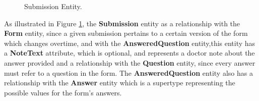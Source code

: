 \begin{figure}[h]
	\begin{center}
	\end{center}
	\caption{Submission Entity.}\label{fig:submission_entity}
\end{figure}

As illustrated in Figure \ref{fig:submission_entity}, the \textbf{Submission} entity as a relationship with the \textbf{Form} entity, since a given submission pertains to a certain version of the form which changes overtime, and with the \textbf{AnsweredQuestion} entity,this entity has a \textbf{NoteText} attribute, which is optional, and represents a doctor note about the answer provided and a relationship with the \textbf{Question} entity, since every answer must refer to a question in the form.
The \textbf{AnsweredQuestion} entity also has a relationship with the \textbf{Answer} entity which is a supertype representing the possible values for the form's answers.



